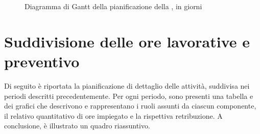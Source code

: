 \begin{figure}[H]
\label{tab:ganttpa1}
\caption{Diagramma di Gantt della pianificazione della \VV, in giorni}
\end{figure}





	
\section{Suddivisione delle ore lavorative e preventivo} \label{sec:preventivo}

Di seguito è riportata la pianificazione di dettaglio delle attività, suddivisa nei periodi descritti precedentemente. Per ogni periodo, sono presenti una tabella e dei grafici che descrivono e rappresentano i ruoli assunti da ciascun componente, il relativo quantitativo di ore impiegato e la rispettiva retribuzione.
A conclusione, è illustrato un quadro riassuntivo.

\newcommand{\roww}[7]{
	#1 & #2 & #3 & #4 & #5 & #6 & #7
}

\newcommand{\x}[7]{
	\begin{figure}[h]
		\begin{tabular}{ | l | c | c | c | c | c | c | r   }
			\hline
			Ruolo / persona & \R & \AM & \AN & \PJ & \PG & \V & Totale ore per persona \\ \hline
			\PB & \roww[#1] \\ \hline
			\LB & \roww[#2] \\ \hline
			\GG & \roww[#3] \\ \hline
			\MM & \roww[#4] \\ \hline
			\LS & \roww[#5] \\ \hline
			\AZ & \roww[#6] \\ \hline
			Totale ore per ruolo & \roww[#7] \\ \hline
		\end{tabular}
	\end{figure}
}

